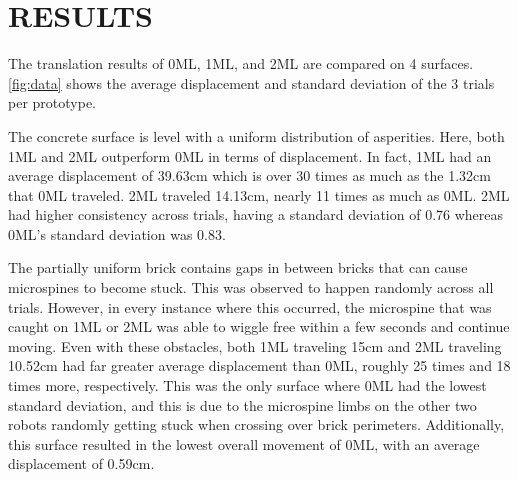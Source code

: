 \section{RESULTS}
The translation results of 0ML, 1ML, and 2ML are compared on 4 surfaces. %
\Fig \ref{fig:data} shows the average displacement and standard deviation of the 3 trials per prototype. 

The concrete surface is level with a uniform distribution of asperities. Here, both 1ML and 2ML outperform 0ML in terms of displacement. In fact, 1ML had an average displacement of 39.63cm which is over 30 times as much as the 1.32cm that 0ML traveled. 2ML traveled 14.13cm, nearly 11 times as much as 0ML. 2ML had higher consistency across trials, having a standard deviation of 0.76 whereas 0ML's standard deviation was 0.83.

The partially uniform brick contains gaps in between bricks that can cause microspines to become stuck. This was observed to happen randomly across all trials. However, in every instance where this occurred, the microspine that was caught on 1ML or 2ML was able to wiggle free within a few seconds and continue moving. Even with these obstacles, both 1ML traveling 15cm and 2ML traveling 10.52cm had far greater average displacement than 0ML, roughly 25 times and 18 times more, respectively. This was the only surface where 0ML had the lowest standard deviation, and this is due to the microspine limbs on the other two robots randomly getting stuck when crossing over brick perimeters. Additionally, this surface resulted in the lowest overall movement of 0ML, with an average displacement of 0.59cm. %

